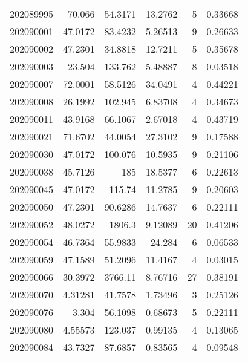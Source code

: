 \begin{tabular}{rrrrrr}
 202089995 &         70.066   &       54.3171 &           13.2762  &           5 & 0.33668 \\
 202090001 &         47.0172  &       83.4232 &            5.26513 &           9 & 0.26633 \\
 202090002 &         47.2301  &       34.8818 &           12.7211  &           5 & 0.35678 \\
 202090003 &         23.504   &      133.762  &            5.48887 &           8 & 0.03518 \\
 202090007 &         72.0001  &       58.5126 &           34.0491  &           4 & 0.44221 \\
 202090008 &         26.1992  &      102.945  &            6.83708 &           4 & 0.34673 \\
 202090011 &         43.9168  &       66.1067 &            2.67018 &           4 & 0.43719 \\
 202090021 &         71.6702  &       44.0054 &           27.3102  &           9 & 0.17588 \\
 202090030 &         47.0172  &      100.076  &           10.5935  &           9 & 0.21106 \\
 202090038 &         45.7126  &      185      &           18.5377  &           6 & 0.22613 \\
 202090045 &         47.0172  &      115.74   &           11.2785  &           9 & 0.20603 \\
 202090050 &         47.2301  &       90.6286 &           14.7637  &           6 & 0.22111 \\
 202090052 &         48.0272  &     1806.3    &            9.12089 &          20 & 0.41206 \\
 202090054 &         46.7364  &       55.9833 &           24.284   &           6 & 0.06533 \\
 202090059 &         47.1589  &       51.2096 &           11.4167  &           4 & 0.03015 \\
 202090066 &         30.3972  &     3766.11   &            8.76716 &          27 & 0.38191 \\
 202090070 &          4.31281 &       41.7578 &            1.73496 &           3 & 0.25126 \\
 202090076 &          3.304   &       56.1098 &            0.68673 &           5 & 0.22111 \\
 202090080 &          4.55573 &      123.037  &            0.99135 &           4 & 0.13065 \\
 202090084 &         43.7327  &       87.6857 &            0.83565 &           4 & 0.09548 \\

\end{tabular}
